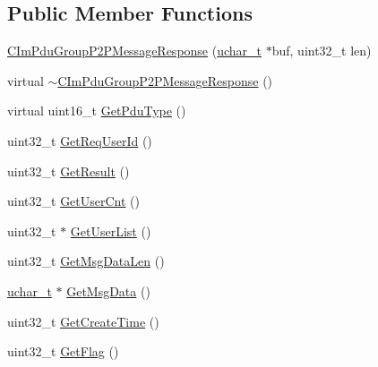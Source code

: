 \subsection*{Public Member Functions}
\begin{DoxyCompactItemize}
\item 
\hyperlink{class_c_im_pdu_group_p2_p_message_response_a9c13c5bac7fd4fef5fdc699f6afc24d5}{C\+Im\+Pdu\+Group\+P2\+P\+Message\+Response} (\hyperlink{base_2ostype_8h_a124ea0f8f4a23a0a286b5582137f0b8d}{uchar\+\_\+t} $\ast$buf, uint32\+\_\+t len)
\item 
virtual \hyperlink{class_c_im_pdu_group_p2_p_message_response_afb06be98c07bb93f4d1725d9ace4b730}{$\sim$\+C\+Im\+Pdu\+Group\+P2\+P\+Message\+Response} ()
\item 
virtual uint16\+\_\+t \hyperlink{class_c_im_pdu_group_p2_p_message_response_a64ab51488003925d9181be65659d9af3}{Get\+Pdu\+Type} ()
\item 
uint32\+\_\+t \hyperlink{class_c_im_pdu_group_p2_p_message_response_a014cdc92745bed0e1b64cd8376f5d931}{Get\+Req\+User\+Id} ()
\item 
uint32\+\_\+t \hyperlink{class_c_im_pdu_group_p2_p_message_response_a01d9c9d0634068b85cd745712d82e0f0}{Get\+Result} ()
\item 
uint32\+\_\+t \hyperlink{class_c_im_pdu_group_p2_p_message_response_a7f6e1677f6d5bdb7ac3278f9a5f8f384}{Get\+User\+Cnt} ()
\item 
uint32\+\_\+t $\ast$ \hyperlink{class_c_im_pdu_group_p2_p_message_response_afa7cd2b26923a9764b6a1fc7392d05d8}{Get\+User\+List} ()
\item 
uint32\+\_\+t \hyperlink{class_c_im_pdu_group_p2_p_message_response_a92fabf8f67fca15bcc770146b2f9d803}{Get\+Msg\+Data\+Len} ()
\item 
\hyperlink{base_2ostype_8h_a124ea0f8f4a23a0a286b5582137f0b8d}{uchar\+\_\+t} $\ast$ \hyperlink{class_c_im_pdu_group_p2_p_message_response_a7a4254d0d795a49f2da03de97caab239}{Get\+Msg\+Data} ()
\item 
uint32\+\_\+t \hyperlink{class_c_im_pdu_group_p2_p_message_response_a3312a6172754845c3b0a42ccfe269f99}{Get\+Create\+Time} ()
\item 
uint32\+\_\+t \hyperlink{class_c_im_pdu_group_p2_p_message_response_af6920e0c61b345efef821ecabdfbc3e8}{Get\+Flag} ()
\end{DoxyCompactItemize}
